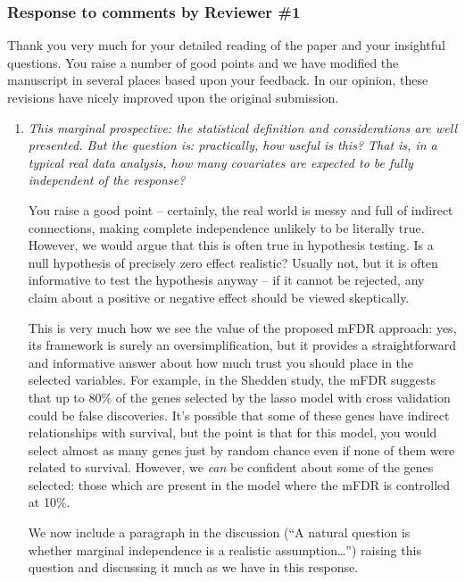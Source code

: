 \documentclass{article}
\begin{document}
\subsubsection*{Response to comments by Reviewer \#1}

Thank you very much for your detailed reading of the paper and your insightful questions. You raise a number of good points and we have modified the manuscript in several places based upon your feedback.  In our opinion, these revisions have nicely improved upon the original submission.

\begin{enumerate}

\item {\em This marginal prospective: the statistical definition and considerations are well presented. But the question is: practically, how useful is this? That is, in a typical real data analysis, how many covariates are expected to be fully independent of the response?}

  You raise a good point -- certainly, the real world is messy and full of indirect connections, making complete independence unlikely to be literally true.  However, we would argue that this is often true in hypothesis testing.  Is a null hypothesis of precisely zero effect realistic?  Usually not, but it is often informative to test the hypothesis anyway -- if it cannot be rejected, any claim about a positive or negative effect should be viewed skeptically.

  This is very much how we see the value of the proposed mFDR approach: yes, its framework is surely an oversimplification, but it provides a straightforward and informative answer about how much trust you should place in the selected variables.  For example, in the Shedden study, the mFDR suggests that up to 80\% of the genes selected by the lasso model with cross validation could be false discoveries.  It's possible that some of these genes have indirect relationships with survival, but the point is that for this model, you would select almost as many genes just by random chance even if none of them were related to survival.  However, we {\em can} be confident about some of the genes selected: those which are present in the model where the mFDR is controlled at 10\%.

  We now include a paragraph in the discussion (``A natural question is whether marginal independence is a realistic assumption\ldots'') raising this question and discussing it much as we have in this response.
  

\end{enumerate}
\end{document}
